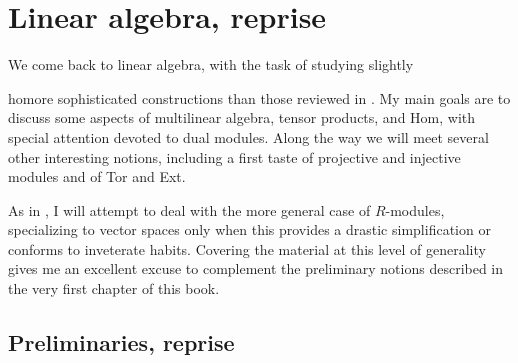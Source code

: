 \chapter{Linear algebra, reprise}
\label{chap:linrep}

We come back to linear algebra, with the task of studying slightly

homore sophisticated constructions than those reviewed in
. My main goals are to discuss some aspects of
multilinear algebra, tensor products, and Hom, with special attention
devoted to dual modules. Along the way we will meet several other
interesting notions, including a first taste of projective and
injective modules and of Tor and Ext.

As in , I will attempt to deal with the more general
case of $R$-modules, specializing to vector spaces only when this
provides a drastic simplification or conforms to inveterate
habits. Covering the material at this level of generality gives me an
excellent excuse to complement the preliminary notions described in
the very first chapter of this book.

\section{Preliminaries, reprise}
\label{sec:linrep:preliminaries-reprise}


